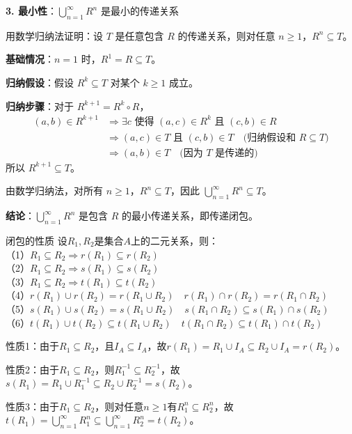 \textbf{3. 最小性}：$\bigcup_{n=1}^{\infty} R^n$ 是最小的传递关系

用数学归纳法证明：设 $T$ 是任意包含 $R$ 的传递关系，则对任意 $n \geq 1$，$R^n \subseteq T$。

\textbf{基础情况}：$n=1$ 时，$R^1 = R \subseteq T$。

\textbf{归纳假设}：假设 $R^k \subseteq T$ 对某个 $k \geq 1$ 成立。

\textbf{归纳步骤}：对于 $R^{k+1} = R^k \circ R$，
\begin{align*}
(a,b) \in R^{k+1} &\Rightarrow \exists c \text{ 使得 } (a,c) \in R^k \text{ 且 } (c,b) \in R \\
&\Rightarrow (a,c) \in T \text{ 且 } (c,b) \in T \quad \text{(归纳假设和 $R \subseteq T$)} \\
&\Rightarrow (a,b) \in T \quad \text{(因为 $T$ 是传递的)}
\end{align*}
所以 $R^{k+1} \subseteq T$。

由数学归纳法，对所有 $n \geq 1$，$R^n \subseteq T$，因此 $\bigcup_{n=1}^{\infty} R^n \subseteq T$。

\textbf{结论}：$\bigcup_{n=1}^{\infty} R^n$ 是包含 $R$ 的最小传递关系，即传递闭包。
\begin{theorem}{闭包的性质}{}
设$R_1,R_2$是集合$A$上的二元关系，则：\\
（1）$R_1\subseteq R_2\Rightarrow r(R_1)\subseteq r(R_2)$\\
（2）$R_1\subseteq R_2\Rightarrow s(R_1)\subseteq s(R_2)$\\
（3）$R_1\subseteq R_2\Rightarrow t(R_1)\subseteq t(R_2)$\\
（4）$r(R_1)\cup r(R_2)=r(R_1\cup R_2)\quad r(R_1)\cap r(R_2)=r(R_1\cap R_2)$\\
（5）$s(R_1)\cup s(R_2)=s(R_1\cup R_2)\quad s(R_1\cap R_2)\subseteq s(R_1)\cap s(R_2)$\\
（6）$t(R_1)\cup t(R_2)\subseteq t(R_1\cup R_2)\quad t(R_1\cap R_2)\subseteq t(R_1)\cap t(R_2)$
\end{theorem}
性质1：由于$R_1 \subseteq R_2$，且$I_A \subseteq I_A$，故$r(R_1) = R_1 \cup I_A \subseteq R_2 \cup I_A = r(R_2)$。

性质2：由于$R_1 \subseteq R_2$，则$R_1^{-1} \subseteq R_2^{-1}$，故$s(R_1) = R_1 \cup R_1^{-1} \subseteq R_2 \cup R_2^{-1} = s(R_2)$。

性质3：由于$R_1 \subseteq R_2$，则对任意$n \geq 1$有$R_1^n \subseteq R_2^n$，故$t(R_1) = \bigcup_{n=1}^{\infty} R_1^n \subseteq \bigcup_{n=1}^{\infty} R_2^n = t(R_2)$。

